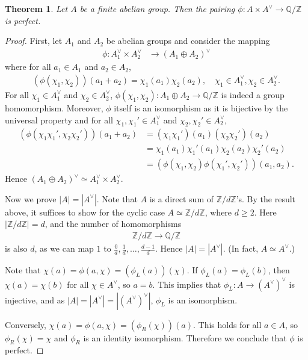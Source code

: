 \documentclass[12pt]{report}
\theoremstyle{plain}
\newtheorem{theorem}{Theorem}[section]
\theoremstyle{remark}
\theoremstyle{definition}
\newcommand{\Z}{\mathbb{Z}}
\newcommand{\Q}{\mathbb{Q}}
\begin{document}
\begin{theorem}
    Let $A$ be a finite abelian group. Then the pairing $\phi:A\times A^\vee\rightarrow \Q/\Z$ is perfect.
\end{theorem}
\begin{proof}
    First, let $A_1$ and $A_2$ be abelian groups and consider the mapping
    \begin{align*}
        \phi:A_1^\vee \times A_2^\vee &\rightarrow (A_1\oplus A_2)^\vee 
    \end{align*}
    where for all $a_1\in A_1$ and $a_2\in A_2$,
    \begin{align*}
        (\phi(\chi_1,\chi_2))(a_1+a_2)=\chi_1(a_1) \chi_2(a_2),\quad \chi_1\in A_1^\vee,\chi_2\in A_2^\vee.
    \end{align*}
    For all $\chi_1\in A_1^\vee$ and $\chi_2\in A_2^\vee$, $\phi(\chi_1,\chi_2):A_1\oplus A_2\rightarrow \Q/\Z$ is indeed a group homomorphism. Moreover, $\phi$ itself is an isomorphism as it is bijective by the universal property and for all $\chi_1,\chi_1'\in A_1^\vee$ and $\chi_2,\chi_2'\in A_2^\vee$,
    \begin{align*}
        (\phi(\chi_1\chi_1',\chi_2\chi_2'))(a_1+a_2) &= (\chi_1\chi_1')(a_1) (\chi_2\chi_2')(a_2) \\
        &= \chi_1(a_1)\chi_1'(a_1)\chi_2(a_2)\chi_2'(a_2) \\
        &= (\phi(\chi_1,\chi_2)\phi(\chi_1',\chi_2'))(a_1,a_2).
    \end{align*}
    Hence $(A_1\oplus A_2)^\vee \simeq A_1^\vee \times A_2^\vee$.

    Now we prove $|A|=|A^\vee|$. Note that $A$ is a direct sum of $\Z/d\Z$'s. By the result above, it suffices to show for the cyclic case $A\simeq \Z/d\Z$, where $d\ge 2$. Here $|\Z/d\Z|=d$, and the number of homomorphisms
    \begin{align*}
        \Z/d\Z\rightarrow \Q/\Z
    \end{align*}
    is also $d$, as we can map $1$ to $\frac{0}{d},\frac{1}{d},\dots,\frac{d-1}{d}$. Hence $|A|=|A^\vee|$. (In fact, $A\simeq A^\vee$.)

    Note that $\chi(a) = \phi(a,\chi)=(\phi_L(a))(\chi)$. If $\phi_L(a) = \phi_L(b)$, then $\chi(a) = \chi(b)$ for all $\chi\in A^\vee$, so $a=b$. This implies that $\phi_L:A\rightarrow (A^\vee)^\vee$ is injective, and as $|A|=|A^\vee|=|(A^\vee)^\vee|$, $\phi_L$ is an isomorphism.

    Conversely, $\chi(a) = \phi(a,\chi) = (\phi_R(\chi))(a)$. This holds for all $a\in A$, so $\phi_R(\chi) = \chi$ and $\phi_R$ is an identity isomorphism. Therefore we conclude that $\phi$ is perfect.
\end{proof}
\end{document}
